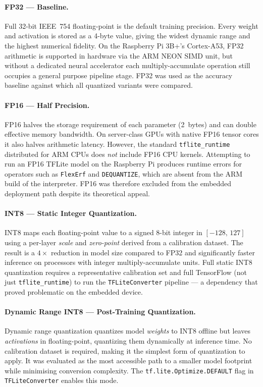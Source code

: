 \paragraph{FP32 — Baseline.}
Full 32-bit IEEE~754 floating-point is the default training precision.
Every weight and activation is stored as a 4-byte value, giving the
widest dynamic range and the highest numerical fidelity. On the
Raspberry Pi 3B+'s Cortex-A53, FP32 arithmetic is supported in
hardware via the ARM NEON SIMD unit, but without a dedicated neural
accelerator each multiply-accumulate operation still occupies a general
purpose pipeline stage. FP32 was used as the accuracy baseline against
which all quantized variants were compared.

\paragraph{FP16 — Half Precision.}
FP16 halves the storage requirement of each parameter (2~bytes) and
can double effective memory bandwidth. On server-class GPUs with
native FP16 tensor cores it also halves arithmetic latency. However,
the standard \texttt{tflite\_runtime} distributed for ARM CPUs does
\emph{not} include FP16 CPU kernels. Attempting to run an FP16 TFLite
model on the Raspberry Pi produces runtime errors for operators such
as \texttt{FlexErf} and \texttt{DEQUANTIZE}, which are absent from
the ARM build of the interpreter. FP16 was therefore excluded from
the embedded deployment path despite its theoretical appeal.

\paragraph{INT8 — Static Integer Quantization.}
INT8 maps each floating-point value to a signed 8-bit integer in
$[-128,\,127]$ using a per-layer \emph{scale} and \emph{zero-point}
derived from a calibration dataset. The result is a $4\times$ reduction
in model size compared to FP32 and significantly faster inference on
processors with integer multiply-accumulate units. Full static INT8
quantization requires a representative calibration set and full
TensorFlow (not just \texttt{tflite\_runtime}) to run the
\texttt{TFLiteConverter} pipeline — a dependency that proved
problematic on the embedded device.

\paragraph{Dynamic Range INT8 — Post-Training Quantization.}
Dynamic range quantization quantizes model \emph{weights} to INT8
offline but leaves \emph{activations} in floating-point, quantizing
them dynamically at inference time. No calibration dataset is required,
making it the simplest form of quantization to apply. It was evaluated
as the most accessible path to a smaller model footprint while
minimising conversion complexity. The \texttt{tf.lite.Optimize.DEFAULT}
flag in \texttt{TFLiteConverter} enables this mode.

